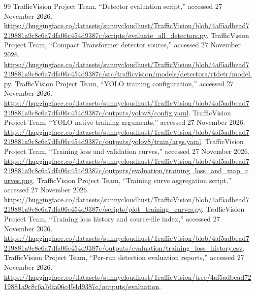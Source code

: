 \begin{thebibliography}{99}
 TrafficVision Project Team, ``Detector evaluation script,'' accessed 27 November 2026. \url{https://huggingface.co/datasets/sunnycloudhust/TrafficVision/blob/4af5adbead7219881a9c8c6a7dfa06c454d9387c/scripts/evaluate_all_detectors.py}.
 TrafficVision Project Team, ``Compact Transformer detector source,'' accessed 27 November 2026. \url{https://huggingface.co/datasets/sunnycloudhust/TrafficVision/blob/4af5adbead7219881a9c8c6a7dfa06c454d9387c/src/trafficvision/models/detectors/rtdetr/model.py}.
 TrafficVision Project Team, ``YOLO training configuration,'' accessed 27 November 2026. \url{https://huggingface.co/datasets/sunnycloudhust/TrafficVision/blob/4af5adbead7219881a9c8c6a7dfa06c454d9387c/outputs/yolov8/config.yaml}.
 TrafficVision Project Team, ``YOLO native training arguments,'' accessed 27 November 2026. \url{https://huggingface.co/datasets/sunnycloudhust/TrafficVision/blob/4af5adbead7219881a9c8c6a7dfa06c454d9387c/outputs/yolov8/train/args.yaml}.
 TrafficVision Project Team, ``Training loss and validation curves,'' accessed 27 November 2026. \url{https://huggingface.co/datasets/sunnycloudhust/TrafficVision/blob/4af5adbead7219881a9c8c6a7dfa06c454d9387c/outputs/evaluation/training_loss_and_map_curves.png}.
 TrafficVision Project Team, ``Training curve aggregation script,'' accessed 27 November 2026. \url{https://huggingface.co/datasets/sunnycloudhust/TrafficVision/blob/4af5adbead7219881a9c8c6a7dfa06c454d9387c/scripts/plot_training_curves.py}.
 TrafficVision Project Team, ``Training loss history and source-file index,'' accessed 27 November 2026. \url{https://huggingface.co/datasets/sunnycloudhust/TrafficVision/blob/4af5adbead7219881a9c8c6a7dfa06c454d9387c/outputs/evaluation/training_loss_history.csv}.
 TrafficVision Project Team, ``Per-run detection evaluation reports,'' accessed 27 November 2026. \url{https://huggingface.co/datasets/sunnycloudhust/TrafficVision/tree/4af5adbead7219881a9c8c6a7dfa06c454d9387c/outputs/evaluation}.
\end{thebibliography}
